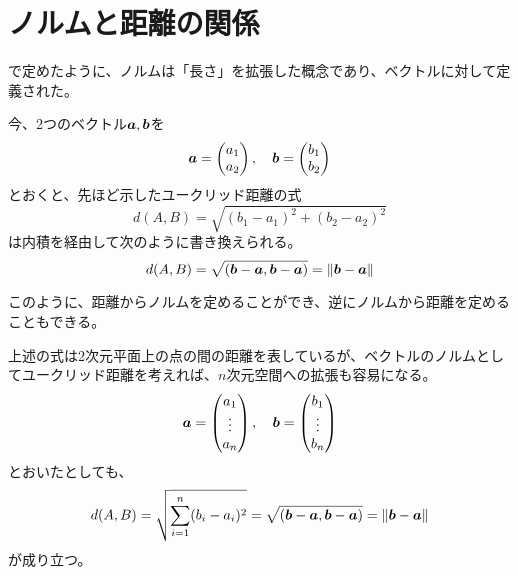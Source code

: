 \documentclass[../../../topic_linear-algebra]{subfiles}
\begin{document}
\sectionline
\section{ノルムと距離の関係}

で定めたように、ノルムは「長さ」を拡張した概念であり、ベクトルに対して定義された。

\br

今、2つのベクトル$\vb*{a},\vb*{b}$を
\begin{equation*}
  \vb*{a} = \begin{pmatrix} a_1 \\ a_2 \end{pmatrix}, \quad
  \vb*{b} = \begin{pmatrix} b_1 \\ b_2 \end{pmatrix}
\end{equation*}
とおくと、先ほど示したユークリッド距離の式
\begin{equation*}
  d(A,B) = \sqrt{(b_1 - a_1)^2 + (b_2 - a_2)^2}
\end{equation*}
は内積を経由して次のように書き換えられる。
\begin{equation*}
  d(A,B) = \sqrt{(\vb*{b}-\vb*{a}, \vb*{b}-\vb*{a})} = \|\vb*{b}-\vb*{a}\|
\end{equation*}

\br

このように、距離からノルムを定めることができ、逆にノルムから距離を定めることもできる。

\br

上述の式は2次元平面上の点の間の距離を表しているが、ベクトルのノルムとしてユークリッド距離を考えれば、$n$次元空間への拡張も容易になる。
\begin{equation*}
  \vb*{a} = \begin{pmatrix} a_1 \\ \vdots \\ a_n \end{pmatrix}, \quad
  \vb*{b} = \begin{pmatrix} b_1 \\ \vdots \\ b_n \end{pmatrix}
\end{equation*}
とおいたとしても、
\begin{equation*}
  d(A,B) = \sqrt{\sum_{i=1}^n (b_i - a_i)^2} = \sqrt{(\vb*{b}-\vb*{a}, \vb*{b}-\vb*{a})} = \|\vb*{b}-\vb*{a}\|
\end{equation*}
が成り立つ。
\end{document}
